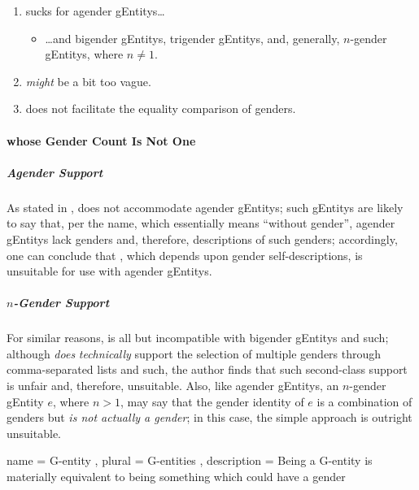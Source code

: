 \documentclass{article}
\begin{document}
\begin{enumerate}
  \item {} sucks for agender \glspl{gEntity}\ldots{}\label{enum:gender1agender}
  \begin{itemize}
    \item \ldots and bigender \glspl{gEntity}, trigender \glspl{gEntity}, and, generally, \(n\)-gender \glspl{gEntity}, where \(n \neq 1\).
  \end{itemize}
  \item {} \emph{might} be a bit too vague.
  \item {} does not facilitate the equality comparison of genders.
\end{enumerate}

\paragraph{ whose Gender Count Is Not One}
\subparagraph{Agender Support}
As stated in ,  does not accommodate agender \glspl{gEntity}; such \glspl{gEntity} are likely to say that,\cite{healthline-agender}\cite{lgbtqia-wiki-agender} per the name, which essentially means ``without gender'',\cite{lgbtqia-wiki-agender} agender \glspl{gEntity} lack genders and, therefore, descriptions of such genders; accordingly, one can conclude that , which depends upon gender self-descriptions, is unsuitable for use with agender \glspl{gEntity}.

\subparagraph{\(n\)-Gender Support}
For similar reasons,  is all but incompatible with bigender \glspl{gEntity} and such; although  \emph{does} \emph{technically} support the selection of multiple genders through comma-separated lists and such, the author finds that such second-class support is unfair and, therefore, unsuitable.  Also, like agender \glspl{gEntity}, an \(n\)-gender \gls{gEntity} \(e\), where \(n > 1\), may say that the gender identity of \(e\) is a combination of genders but \emph{is not actually a gender}; in this case, the simple  approach is outright unsuitable.

\printbibliography{}

  { name = {G-entity}
  , plural = {G-entities}
  , description = Being a G-entity is materially equivalent to being something which could have a gender
  }

\printglossary{}
\end{document}
